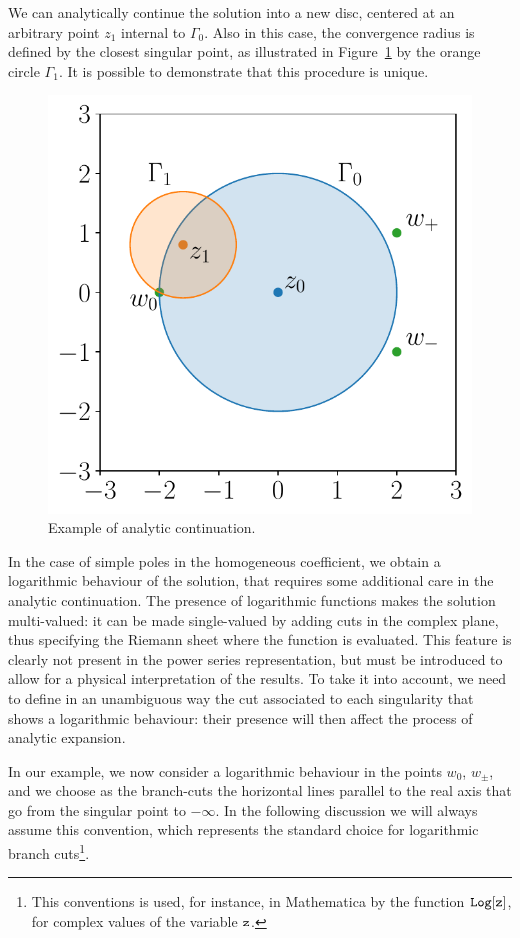 We can analytically continue the solution into a new disc, centered at an arbitrary point $z_1$ internal to $\Gamma_0$. Also in this case, the convergence radius is defined by the closest singular point, as illustrated in Figure~\ref{fig:analcont} by the orange circle $\Gamma_1$.
It is possible to demonstrate that this procedure is unique.

\begin{figure}[t]
\centering
\includegraphics[width=0.5 \textwidth]{Images/analytic_continuation.pdf}
\caption{\label{fig:analcont}
  Example of analytic continuation.}
\end{figure}

In the case of simple poles in the homogeneous coefficient, we obtain a logarithmic behaviour of the solution, that requires some additional care in the analytic continuation.
The presence of logarithmic functions makes the solution multi-valued: it can be made single-valued by adding cuts in the complex plane, thus specifying the Riemann sheet where the function is evaluated.
This feature is clearly not present in the power series representation, but must be introduced to allow for a physical interpretation of the results.
To take it into account, we need to define in an unambiguous way the cut associated to each singularity that shows a logarithmic behaviour: their presence will then affect the process of analytic expansion.

In our example, we now consider a logarithmic behaviour in the points $w_0$, $w_\pm$, and we choose as the branch-cuts the horizontal lines parallel to the real axis that go from the singular point to $-\infty$.
In the following discussion we will always assume this convention,
which represents the standard choice for logarithmic branch cuts\footnote{This conventions is used, for instance, in {\sc Mathematica} by the function $\tt{Log[z]}$, for complex values of the variable $\tt{z}$.}.


